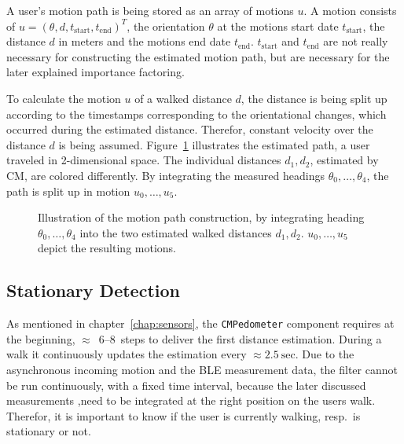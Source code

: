 A user's motion path is being stored as an array of motions $u$. A motion consists of $u = (\theta, d, t_\text{start}, t_\text{end})^T$, the orientation $\theta$ at the motions start date $t_\text{start}$, the distance $d$ in meters and the motions end date $t_\text{end}$. $t_\text{start}$ and $t_\text{end}$ are not really necessary for constructing the estimated motion path, but are necessary for the later explained importance factoring.

To calculate the motion $u$ of a walked distance $d$, the distance is being split up according to the timestamps corresponding to the orientational changes, which occurred during the estimated distance. Therefor, constant velocity over the distance $d$ is being assumed. Figure~\ref{fig:mm_path} illustrates the estimated path, a user traveled in 2-dimensional space. The individual distances $d_1, d_2$, estimated by \acs{CM}, are colored differently. By integrating the measured headings $\theta_0, \ldots, \theta_4$, the path is split up in motion $u_0, \ldots, u_5$.


\begin{figure}
	
	\caption{Illustration of the motion path construction, by integrating heading $\theta_0, \ldots, \theta_4$ into the two estimated walked distances $d_1, d_2$. $u_0, \ldots, u_5$ depict the resulting motions.}
	\label{fig:mm_path}
\end{figure}


\subsection{Stationary Detection}\label{sec:algo_stationary}
As mentioned in chapter~\ref{chap:sensors}, the \texttt{CMPedometer} component requires at the beginning, $\approx$~6--8~steps to deliver the first distance estimation. During a walk it continuously updates the estimation every $\approx 2.5~\text{sec}$. Due to the asynchronous incoming motion and the \acs{BLE} measurement data, the filter cannot be run continuously, with a fixed time interval, because the later discussed measurements ,need to be integrated at the right position on the users walk. Therefor, it is important to know if the user is currently walking, resp.\ is stationary or not.

